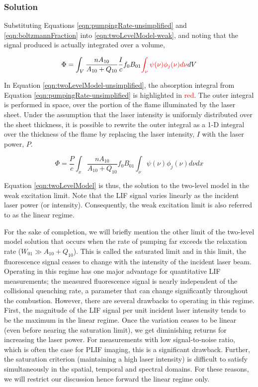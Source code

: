 \subsubsection{Solution}
\label{subsubsec:basic-model-solution}

Substituting Equations \ref{eqn:pumpingRate-unsimplified} and \ref{eqn:boltzmannFraction} into \ref{eqn:twoLevelModel-weak}, and noting that the signal produced is actually integrated over a volume,

\begin{equation}
  \Phi = \int_V \frac{n A_{10}}{A_{10} + Q_{10}} \frac{I}{c} f_0 B_{01} \textcolor{red}{\int_\nu \psi(\nu) \phi_j(\nu) d\nu} dV
  \label{eqn:twoLevelModel-unsimplified}
\end{equation}

In Equation \ref{eqn:twoLevelModel-unsimplified}, the absorption integral from Equation \ref{eqn:pumpingRate-unsimplified} is highlighted in \textcolor{red}{red}.
The outer integral is performed in space, over the portion of the flame illuminated by the laser sheet.
Under the assumption that the laser intensity is uniformly distributed over the sheet thickness, it is possible to rewrite the outer integral as a 1-D integral over the thickness of the flame by replacing the laser intensity, \(I\) with the laser power, \(P\).

\begin{equation}
  \Phi = \frac{P}{c} \int_x \frac{n A_{10}}{A_{10}+Q_{10}} f_0 B_{01} \int_\nu \psi(\nu) \phi_j(\nu) d\nu dx
  \label{eqn:twoLevelModel}
\end{equation}

Equation \ref{eqn:twoLevelModel} is thus, the solution to the two-level model in the weak excitation limit.
Note that the LIF signal varies linearly as the incident laser power (or intensity).
Consequently, the weak excitation limit is also referred to as the linear regime.

For the sake of completion, we will briefly mention the other limit of the two-level model solution that occurs when the rate of pumping far exceeds the relaxation rate (\(W_{01} \gg A_{10} + Q_{10}\)).
This is called the saturated limit and in this limit, the fluorescence signal ceases to change with the intensity of the incident laser beam.
Operating in this regime has one major advantage for quantitative LIF measurements; the measured fluorescence signal is nearly independent of the collisional quenching rate, a parameter that can change significantly throughout the combustion.
However, there are several drawbacks to operating in this regime.
First, the magnitude of the LIF signal per unit incident laser intensity tends to be the maximum in the linear regime.
Once the variation ceases to be linear (even before nearing the saturation limit), we get diminishing returns for increasing the laser power.
For measurements with low signal-to-noise ratio, which is often the case for PLIF imaging, this is a significant drawback.
Further, the saturation criterion (maintaining a high laser intensity) is difficult to satisfy simultaneously in the spatial, temporal and spectral domains.
For these reasons, we will restrict our discussion hence forward the linear regime only.

